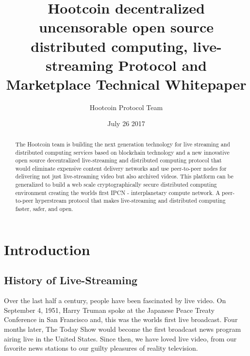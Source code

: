 \documentclass{article}
\title{Hootcoin decentralized uncensorable open source distributed computing, live-streaming Protocol and Marketplace Technical Whitepaper}
\author{Hootcoin Protocol Team}
\date{July 26 2017}
\begin{document}
\maketitle

\begin{abstract}
The Hootcoin team is building the next generation technology for live
streaming and distributed computing services based on blockchain technology and a new
innovative open source decentralized live-streaming and distributed computing protocol that would eliminate expensive content delivery networks and use peer-to-peer nodes for delivering not just live-streaming video but also archived videos. This platform can be generalized to build a web scale cryptographically secure distributed computing environment creating the worlds first IPCN - interplanetary compute network. A peer-to-peer hyperstream protocol that makes live-streaming and distributed computing faster, safer, and open.

\end{abstract}
\newpage

\tableofcontents
\newpage

\section{Introduction}
\subsection{History of Live-Streaming}
Over the last half a century, people have been fascinated by live video. On September 4, 1951, Harry Truman spoke at the Japanese Peace Treaty Conference in San Francisco and, this was the worlds first live broadcast. Four months later, The Today Show would become the first broadcast news program airing live in the United States. Since then, we have loved live video, from our favorite news stations to our guilty pleasures of reality television.

\end{document}
